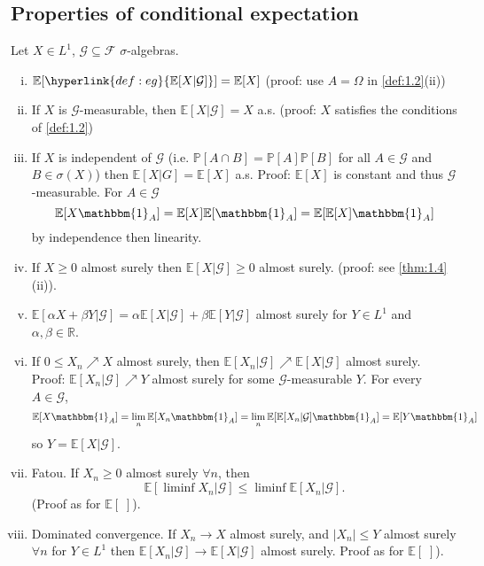 \documentclass{article}
\newcommand{\F}{\mathcal{F}}
\newcommand{\G}{\mathcal{G}}
\newcommand{\1}[1]{\mathbbm{1}_{#1}}
\newcommand{\Prob}{\mathbb{P}}
\newcommand{\E}{\mathbb{E}}
\begin{document}
\subsection{Properties of conditional expectation}
Let $X \in L^1$, $\G \subseteq \F$ $\sigma$-algebras.
\begin{enumerate}[(i)]
  \item $\E[\hyperlink{def:eg}{\E[X | \G]}] = \E[X]$ (proof: use $A = \Omega$ in \cref{def:1.2}(ii))
  \item If $X$ is $\G$-measurable, then $\E[X | \G] = X$ a.s. (proof: $X$ satisfies the conditions of \cref*{def:1.2})
  \item If $X$ is \hypertarget{def:indep}{independent} of $\G$ (i.e. $\Prob[A \cap B] = \Prob[A] \Prob[B]$ for all $A \in \G$ and $B \in \sigma(X)$) then $\E[X | G] = \E[X]$ a.s.
    Proof: $\E[X]$ is constant and thus $\G$-measurable. For $A \in \G$
    \begin{equation*}
      \E[X \1A] = \E[X] \E[\1A] = \E[\E[X] \1A]
    \end{equation*}
    by independence then linearity.
  \item If $X \geq 0$ almost surely then $\E[X|\G] \geq 0$ almost surely.
    (proof: see \cref{thm:1.4}(ii)).
  \item $\E[\alpha X + \beta Y | \G] = \alpha \E[X | \G] + \beta \E[Y | \G]$ almost surely for $Y \in L^1$ and $\alpha,\beta \in \mathbb{R}$.
  \item If $0 \leq X_n \nearrow X$ almost surely, then $\E[X_n | \G] \nearrow \E[X | \G]$ almost surely.
    Proof: $\E[X_n | \G] \nearrow Y$ almost surely for some $\G$-measurable $Y$. For every $A \in \G$,
    \begin{equation*}
      \E[X \1A] = \lim_n \E[X_n \1A] = \lim_n \E[\E[X_n | \G] \1A] = \E[Y \1A]
    \end{equation*}
    so $Y = \E[X | \G]$.
  \item {}Fatou. If $X_n \geq 0$ almost surely $\forall n$, then
    \begin{equation*}
      \E[\liminf X_n | \G] \leq \liminf \E[X_n | \G].
    \end{equation*}
    (Proof as for $\E[\;]$).
  \item Dominated convergence. If $X_n \to X$ almost surely, and $|X_n| \leq Y$ almost surely $\forall n$ for $Y \in L^1$ then $\E[X_n | \G] \to \E[X | \G]$ almost surely. Proof as for $\E[\;]$).

\end{enumerate}
\end{document}
